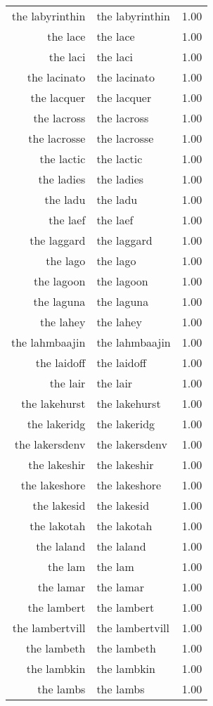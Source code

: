 \begin{table}[ht]
\begin{tabular}{rlr}
  the labyrinthin & the labyrinthin & 1.00 \\ 
  the lace & the lace & 1.00 \\ 
  the laci & the laci & 1.00 \\ 
  the lacinato & the lacinato & 1.00 \\ 
  the lacquer & the lacquer & 1.00 \\ 
  the lacross & the lacross & 1.00 \\ 
  the lacrosse & the lacrosse & 1.00 \\ 
  the lactic & the lactic & 1.00 \\ 
  the ladies & the ladies & 1.00 \\ 
  the ladu & the ladu & 1.00 \\ 
  the laef & the laef & 1.00 \\ 
  the laggard & the laggard & 1.00 \\ 
  the lago & the lago & 1.00 \\ 
  the lagoon & the lagoon & 1.00 \\ 
  the laguna & the laguna & 1.00 \\ 
  the lahey & the lahey & 1.00 \\ 
  the lahmbaajin & the lahmbaajin & 1.00 \\ 
  the laidoff & the laidoff & 1.00 \\ 
  the lair & the lair & 1.00 \\ 
  the lakehurst & the lakehurst & 1.00 \\ 
  the lakeridg & the lakeridg & 1.00 \\ 
  the lakersdenv & the lakersdenv & 1.00 \\ 
  the lakeshir & the lakeshir & 1.00 \\ 
  the lakeshore & the lakeshore & 1.00 \\ 
  the lakesid & the lakesid & 1.00 \\ 
  the lakotah & the lakotah & 1.00 \\ 
  the laland & the laland & 1.00 \\ 
  the lam & the lam & 1.00 \\ 
  the lamar & the lamar & 1.00 \\ 
  the lambert & the lambert & 1.00 \\ 
  the lambertvill & the lambertvill & 1.00 \\ 
  the lambeth & the lambeth & 1.00 \\ 
  the lambkin & the lambkin & 1.00 \\ 
  the lambs & the lambs & 1.00 \\ 

\end{tabular}
\end{table}
